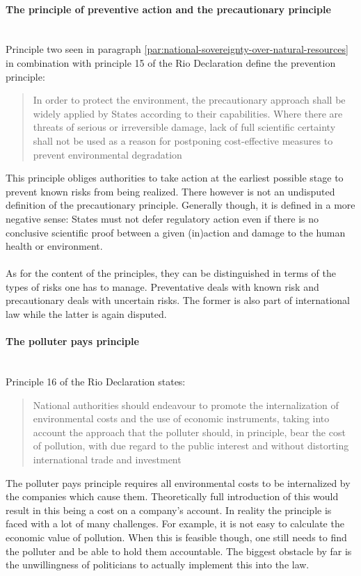 \documentclass[../summary.tex]{subfiles}
\begin{document}
			\paragraph{The principle of preventive action and the precautionary principle}\mbox{}\\
				Principle two seen in paragraph \ref{par:national-sovereignty-over-natural-resources} in combination with principle 15 of the Rio Declaration define the prevention principle: 
				\begin{quote}
					In order to protect the environment, the precautionary approach shall be widely applied by States according to their capabilities. Where there are threats of serious or irreversible damage, lack of full scientific certainty shall not be used as a reason for postponing cost-effective measures to prevent environmental degradation
				\end{quote}
				This principle obliges authorities to take action at the earliest possible stage to prevent known risks from being realized. There however is not an undisputed definition of the precautionary principle. Generally though, it is defined in a more negative sense: States must not defer regulatory action even if there is no conclusive scientific proof between a given (in)action and damage to the human health or environment.\\
				\\
				As for the content of the principles, they can be distinguished in terms of the types of risks one has to manage. Preventative deals with known risk and precautionary deals with uncertain risks. The former is also part of international law while the latter is again disputed. 
				
			\paragraph{The polluter pays principle}\mbox{}\\
				Principle 16 of the Rio Declaration states:
				\begin{quote}
					National authorities should endeavour to promote the internalization of environmental costs and the use of economic instruments, taking into account the approach that the polluter should, in principle, bear the cost of pollution, with due regard to the public interest and without distorting international trade and investment
				\end{quote}
				The polluter pays principle requires all environmental costs to be internalized by the companies which cause them. Theoretically full introduction of this would result in this being a cost on a company's account. In reality the principle is faced with a lot of many challenges. For example, it is not easy to calculate the economic value of pollution. When this is feasible though, one still  needs to find the polluter and be able to hold them accountable.  The biggest obstacle by far is the unwillingness of politicians to actually implement this into the law.
				
\end{document}
